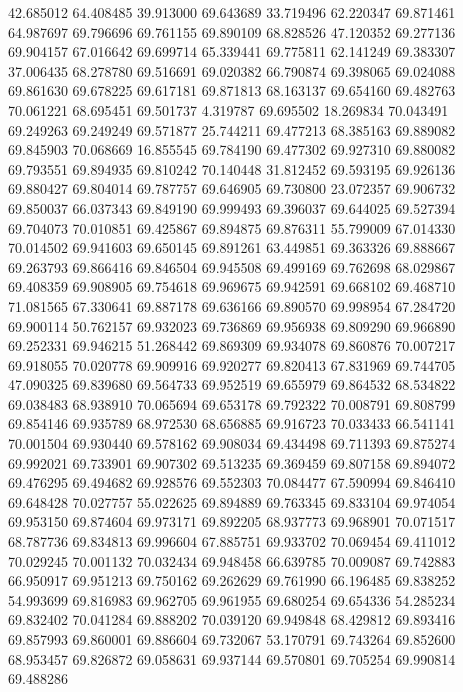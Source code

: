 42.685012
64.408485
39.913000
69.643689
33.719496
62.220347
69.871461
64.987697
69.796696
69.761155
69.890109
68.828526
47.120352
69.277136
69.904157
67.016642
69.699714
65.339441
69.775811
62.141249
69.383307
37.006435
68.278780
69.516691
69.020382
66.790874
69.398065
69.024088
69.861630
69.678225
69.617181
69.871813
68.163137
69.654160
69.482763
70.061221
68.695451
69.501737
4.319787
69.695502
18.269834
70.043491
69.249263
69.249249
69.571877
25.744211
69.477213
68.385163
69.889082
69.845903
70.068669
16.855545
69.784190
69.477302
69.927310
69.880082
69.793551
69.894935
69.810242
70.140448
31.812452
69.593195
69.926136
69.880427
69.804014
69.787757
69.646905
69.730800
23.072357
69.906732
69.850037
66.037343
69.849190
69.999493
69.396037
69.644025
69.527394
69.704073
70.010851
69.425867
69.894875
69.876311
55.799009
67.014330
70.014502
69.941603
69.650145
69.891261
63.449851
69.363326
69.888667
69.263793
69.866416
69.846504
69.945508
69.499169
69.762698
68.029867
69.408359
69.908905
69.754618
69.969675
69.942591
69.668102
69.468710
71.081565
67.330641
69.887178
69.636166
69.890570
69.998954
67.284720
69.900114
50.762157
69.932023
69.736869
69.956938
69.809290
69.966890
69.252331
69.946215
51.268442
69.869309
69.934078
69.860876
70.007217
69.918055
70.020778
69.909916
69.920277
69.820413
67.831969
69.744705
47.090325
69.839680
69.564733
69.952519
69.655979
69.864532
68.534822
69.038483
68.938910
70.065694
69.653178
69.792322
70.008791
69.808799
69.854146
69.935789
68.972530
68.656885
69.916723
70.033433
66.541141
70.001504
69.930440
69.578162
69.908034
69.434498
69.711393
69.875274
69.992021
69.733901
69.907302
69.513235
69.369459
69.807158
69.894072
69.476295
69.494682
69.928576
69.552303
70.084477
67.590994
69.846410
69.648428
70.027757
55.022625
69.894889
69.763345
69.833104
69.974054
69.953150
69.874604
69.973171
69.892205
68.937773
69.968901
70.071517
68.787736
69.834813
69.996604
67.885751
69.933702
70.069454
69.411012
70.029245
70.001132
70.032434
69.948458
66.639785
70.009087
69.742883
66.950917
69.951213
69.750162
69.262629
69.761990
66.196485
69.838252
54.993699
69.816983
69.962705
69.961955
69.680254
69.654336
54.285234
69.832402
70.041284
69.888202
70.039120
69.949848
68.429812
69.893416
69.857993
69.860001
69.886604
69.732067
53.170791
69.743264
69.852600
68.953457
69.826872
69.058631
69.937144
69.570801
69.705254
69.990814
69.488286

